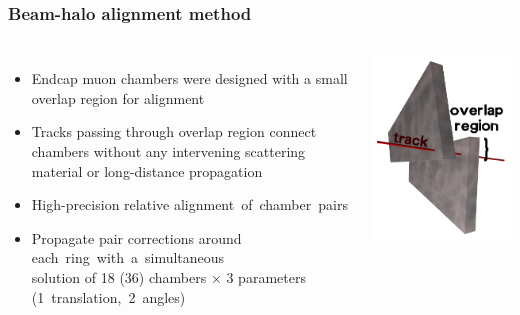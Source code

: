\documentclass[compress]{beamer}
\begin{document}
\begin{frame}
\frametitle{Beam-halo alignment method}

\vspace{-0.15 cm}
\begin{columns}
\vspace{0.3 cm}
\begin{itemize}
\item Endcap muon chambers were designed with a small overlap region for alignment
\item Tracks passing through overlap region connect chambers without
  any intervening scattering material or long-distance propagation
\item High-precision relative \mbox{alignment of chamber pairs\hspace{-1 cm}}
\item Propagate pair corrections around \mbox{each ring with a simultaneous\hspace{-3 cm}} \\ solution of 18 (36) chambers $\times$ 3 parameters \mbox{(1 translation, 2 angles)\hspace{-5 cm}}
\end{itemize}

\includegraphics[width=0.8\linewidth]{overlaps.png}
\end{columns}


\end{frame}
\end{document}
